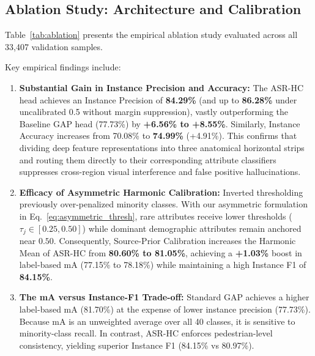 \subsection{Ablation Study: Architecture and Calibration}
Table~\ref{tab:ablation} presents the empirical ablation study evaluated across all 33,407 validation samples.

Key empirical findings include:
\begin{enumerate}
    \item \textbf{Substantial Gain in Instance Precision and Accuracy:} The ASR-HC head achieves an Instance Precision of \textbf{84.29\%} (and up to \textbf{86.28\%} under uncalibrated 0.5 without margin suppression), vastly outperforming the Baseline GAP head (77.73\%) by \textbf{+6.56\% to +8.55\%}. Similarly, Instance Accuracy increases from 70.08\% to \textbf{74.99\%} (+4.91\%). This confirms that dividing deep feature representations into three anatomical horizontal strips and routing them directly to their corresponding attribute classifiers suppresses cross-region visual interference and false positive hallucinations.
    \item \textbf{Efficacy of Asymmetric Harmonic Calibration:} Inverted thresholding previously over-penalized minority classes. With our asymmetric formulation in Eq.~\eqref{eq:asymmetric_thresh}, rare attributes receive lower thresholds ($\tau_j \in [0.25, 0.50]$) while dominant demographic attributes remain anchored near $0.50$. Consequently, Source-Prior Calibration increases the Harmonic Mean of ASR-HC from \textbf{80.60\% to 81.05\%}, achieving a \textbf{+1.03\%} boost in label-based $\mathrm{mA}$ (77.15\% to 78.18\%) while maintaining a high Instance F1 of \textbf{84.15\%}.
    \item \textbf{The mA versus Instance-F1 Trade-off:} Standard GAP achieves a higher label-based $\mathrm{mA}$ (81.70\%) at the expense of lower instance precision (77.73\%). Because $\mathrm{mA}$ is an unweighted average over all 40 classes, it is sensitive to minority-class recall. In contrast, ASR-HC enforces pedestrian-level consistency, yielding superior Instance F1 (84.15\% vs 80.97\%).
\end{enumerate}

